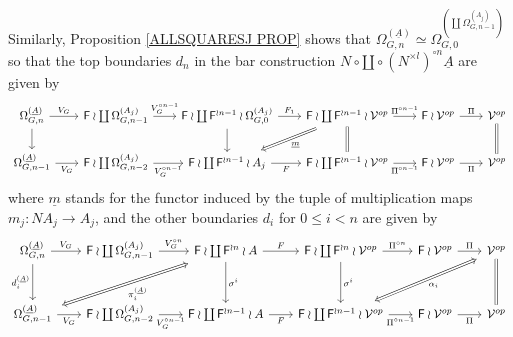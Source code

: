 \documentclass[a4paper,10pt]{article}%
\begin{document}
Similarly, Proposition \ref{ALLSQUARESJ PROP} shows that
$\Omega_{G,n}^{(\underline{A})} \simeq
\Omega_{G,0}^{\left( \coprod \Omega_{G,n-1}^{(A_j)} \right)}$
so that the top boundaries $d_n$ in the bar construction
$N \circ \amalg \circ (N^{\times l})^{\circ n} \underline{A}$
are given by
\begin{equation}
	\begin{tikzcd}[column sep=2em]
	\Omega_{G,n}^{(\underline{A})} \ar{d} \ar{r}{V_G} &
	\Fin \wr \coprod \Omega_{G,n-1}^{(A_j)} \ar{r}{V_G^{\circ n-1}}&
	\Fin \wr \coprod \Fin^{\wr n-1} \wr \Omega_{G,0}^{(A_j)} \ar{r}{F_1} \ar{d}&
	|[alias=dog2]|
	\Fin \wr \coprod \Fin^{\wr n-1} \wr \mathcal{V}^{op} \ar{r}{\Pi^{\circ n-1}}  \ar[equal]{d} &
	\Fin \wr \mathcal{V}^{op} \ar{r}{\Pi} &
	\mathcal{V}^{op} \ar[equal]{d}
\\
	\Omega_{G,n-1}^{(\underline{A})} \ar{r}[swap]{V_G} &
	\Fin \wr \coprod \Omega_{G,n-2}^{(A_j)} \ar{r}[swap]{V_G^{\circ n-1}}&
	|[alias=cat3]|
	\Fin \wr \coprod \Fin^{\wr n-1} \wr A_j \ar{r}[swap]{F} &
	\Fin \wr \coprod \Fin^{\wr n-1} \wr \mathcal{V}^{op} \ar{r}[swap]{\Pi^{\circ n-1}} &
	\Fin \wr \mathcal{V}^{op} \ar{r}[swap]{\Pi} &
	|[alias=dog]|
	\mathcal{V}^{op}
	\arrow[Rightarrow, from=dog2, to=cat3,shorten <=0.15cm,,shorten >=0.15cm,"\underline{m}"]
	\end{tikzcd}
\end{equation}
where $\underline{m}$ stands for the functor induced by the tuple of multiplication maps $m_j \colon N A_j \to A_j$, 
and the other boundaries $d_i$ for $0 \leq i < n$ are given by
\begin{equation}\label{DISJBARDN EQ}
	\begin{tikzcd}[column sep=2em,row sep=3em]
	\Omega_{G,n}^{(\underline{A})} 
	\ar{d}[swap]{d_i^{(\underline{A})}} \ar{r}{V_G} &
	\Fin \wr \coprod \Omega_{G,n-1}^{(A_j)} \ar{r}{V_G^{\circ n}} &
	|[alias=dog2]|
	\Fin \wr \coprod \Fin^{\wr n} \wr A \ar{r}{F} \ar{d}{\sigma^i}&
	\Fin \wr \coprod \Fin^{\wr n} \wr \mathcal{V}^{op} \ar{r}{\Pi^{\circ n}}  \ar{d}{\sigma^i} &
	\Fin \wr \mathcal{V}^{op} \ar{r}{\Pi} &
	|[alias=dog3]|
	\mathcal{V}^{op} \ar[equal]{d}
\\
	|[alias=cat3]|
	\Omega_{G,n-1}^{(\underline{A})} \ar{r}[swap]{V_G} &
	\Fin \wr \coprod \Omega_{G,n-2}^{(A_j)} \ar{r}[swap]{V_G^{\circ n-1}}&
	\Fin \wr \coprod \Fin^{\wr n-1} \wr A \ar{r}[swap]{F} &
	|[alias=cat2]|
	\Fin \wr \coprod \Fin^{\wr n-1} \wr \mathcal{V}^{op} \ar{r}[swap]{\Pi^{\circ n-1}} &
	\Fin \wr \mathcal{V}^{op} \ar{r}[swap]{\Pi} &
	\mathcal{V}^{op}
	\arrow[Leftrightarrow, from=dog2, to=cat3,shorten <=0.15cm,,shorten >=0.15cm,"\pi_i^{(\underline{A})}"]
	\arrow[Leftrightarrow, from=dog3, to=cat2,shorten <=0.15cm,,shorten >=0.15cm,"\alpha_i"]
	\end{tikzcd}
\end{equation}
\end{document}
